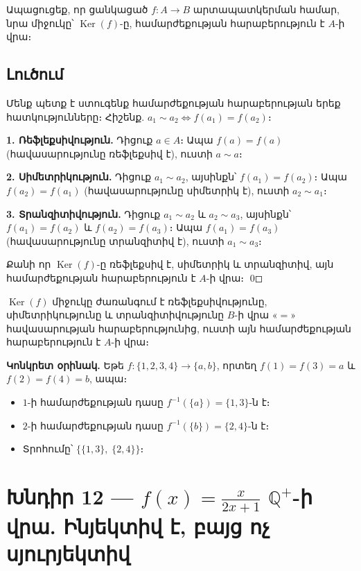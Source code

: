 \documentclass[12pt, a4paper]{article}
\newcommand{\Q}{\mathbb{Q}}
\begin{document}
\begin{problembox}
Ապացուցեք, որ ցանկացած $f : A \to B$ արտապատկերման համար, նրա միջուկը՝ $\operatorname{Ker}(f)$-ը, համարժեքության հարաբերություն է $A$-ի վրա։
\end{problembox}

\subsection*{Լուծում}

Մենք պետք է ստուգենք համարժեքության հարաբերության երեք հատկությունները։
Հիշենք. $a_1 \sim a_2 \iff f(a_1) = f(a_2)$։

\textbf{1. Ռեֆլեքսիվություն.}\;
Դիցուք $a \in A$։ Ապա $f(a) = f(a)$ (հավասարությունը ռեֆլեքսիվ է), ուստի $a \sim a$։ \checkmark

\textbf{2. Սիմետրիկություն.}\;
Դիցուք $a_1 \sim a_2$, այսինքն՝ $f(a_1) = f(a_2)$։
Ապա $f(a_2) = f(a_1)$ (հավասարությունը սիմետրիկ է), ուստի $a_2 \sim a_1$։ \checkmark

\textbf{3. Տրանզիտիվություն.}\;
Դիցուք $a_1 \sim a_2$ և $a_2 \sim a_3$, այսինքն՝ $f(a_1) = f(a_2)$ և $f(a_2) = f(a_3)$։
Ապա $f(a_1) = f(a_3)$ (հավասարությունը տրանզիտիվ է), ուստի $a_1 \sim a_3$։ \checkmark

\medskip
Քանի որ $\operatorname{Ker}(f)$-ը ռեֆլեքսիվ է, սիմետրիկ և տրանզիտիվ, այն համարժեքության հարաբերություն է $A$-ի վրա։ \qed

\begin{answerbox}
$\operatorname{Ker}(f)$ միջուկը ժառանգում է ռեֆլեքսիվությունը, սիմետրիկությունը և տրանզիտիվությունը $B$-ի վրա «$=$» հավասարության հարաբերությունից, ուստի այն համարժեքության հարաբերություն է $A$-ի վրա։
\end{answerbox}

\bigskip
\textbf{Կոնկրետ օրինակ.}\; Եթե $f \colon \{1,2,3,4\} \to \{a,b\}$, որտեղ $f(1) = f(3) = a$ և $f(2) = f(4) = b$, ապա։
\begin{itemize}[nosep]
  \item $1$-ի համարժեքության դասը $f^{-1}(\{a\}) = \{1, 3\}$-ն է։
  \item $2$-ի համարժեքության դասը $f^{-1}(\{b\}) = \{2, 4\}$-ն է։
  \item Տրոհումը՝ $\bigl\{\{1,3\},\;\{2,4\}\bigr\}$։
\end{itemize}

\newpage
\section{Խնդիր 12 — \texorpdfstring{$f(x) = \frac{x}{2x+1}$}{f(x)=x/(2x+1)} \texorpdfstring{$\Q^+$}{Q+}-ի վրա. Ինյեկտիվ է, բայց ոչ սյուրյեկտիվ}
\end{document}
